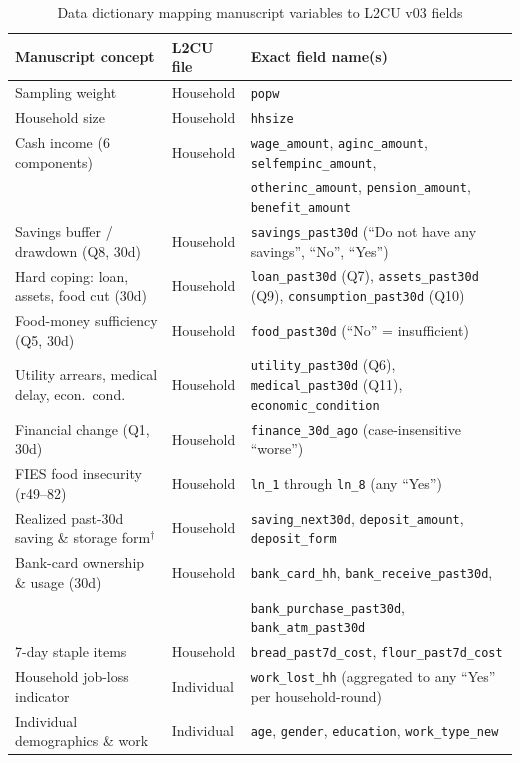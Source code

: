 \documentclass[11pt]{article}
\begin{document}
\begin{table}[htbp]
\centering
\caption{Data dictionary mapping manuscript variables to L2CU v03 fields}
\label{tab:dict}
\scriptsize
\setlength{\tabcolsep}{2.2pt}
\begin{tabular}{lll}
\toprule
Manuscript concept & L2CU file & Exact field name(s) \\
\midrule
Sampling weight & Household & \texttt{popw} \\
Household size & Household & \texttt{hhsize} \\
Cash income (6 components) & Household & \texttt{wage\_amount}, \texttt{aginc\_amount}, \texttt{selfempinc\_amount}, \\
 & & \texttt{otherinc\_amount}, \texttt{pension\_amount}, \texttt{benefit\_amount} \\
Savings buffer / drawdown (Q8, 30d) & Household & \texttt{savings\_past30d} (``Do not have any savings'', ``No'', ``Yes'') \\
Hard coping: loan, assets, food cut (30d) & Household & \texttt{loan\_past30d} (Q7), \texttt{assets\_past30d} (Q9), \texttt{consumption\_past30d} (Q10) \\
Food-money sufficiency (Q5, 30d) & Household & \texttt{food\_past30d} (``No'' = insufficient) \\
Utility arrears, medical delay, econ.\ cond. & Household & \texttt{utility\_past30d} (Q6), \texttt{medical\_past30d} (Q11), \texttt{economic\_condition} \\
Financial change (Q1, 30d) & Household & \texttt{finance\_30d\_ago} (case-insensitive ``worse'') \\
FIES food insecurity (r49--82) & Household & \texttt{ln\_1} through \texttt{ln\_8} (any ``Yes'') \\
Realized past-30d saving \& storage form$^\dagger$ & Household & \texttt{saving\_next30d}, \texttt{deposit\_amount}, \texttt{deposit\_form} \\
Bank-card ownership \& usage (30d) & Household & \texttt{bank\_card\_hh}, \texttt{bank\_receive\_past30d}, \\
 & & \texttt{bank\_purchase\_past30d}, \texttt{bank\_atm\_past30d} \\
7-day staple items & Household & \texttt{bread\_past7d\_cost}, \texttt{flour\_past7d\_cost} \\
Household job-loss indicator & Individual & \texttt{work\_lost\_hh} (aggregated to any ``Yes'' per household-round) \\
Individual demographics \& work & Individual & \texttt{age}, \texttt{gender}, \texttt{education}, \texttt{work\_type\_new} \\

\end{tabular}
\end{table}
\end{document}
